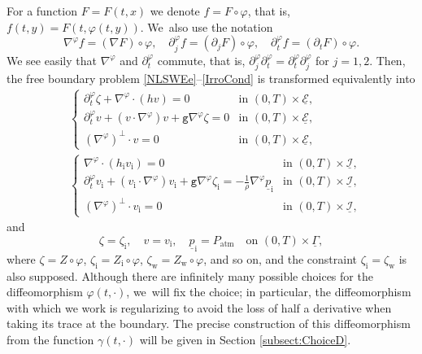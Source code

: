 \documentclass[10pt]{amsart}
\newcommand{\gr}{{\mathtt g}}
\newcommand{\dt}{\partial_t}
\newcommand{\cI}{{\mathcal I}}
\newcommand{\cE}{{\mathcal E}}
\newcommand{\ul}[1]{\underline{#1}}
\newcommand{\itGamma}{\mathit{\Gamma}}
\theoremstyle{definition}
\begin{document}
For a function $F=F(t,x)$ we denote $f=F\circ\varphi$, that is, $f(t,y)=F(t,\varphi(t,y))$. We~also use the notation
\begin{equation}\label{DiffOP}
\nabla^\varphi f=(\nabla F)\circ\varphi, \quad \partial_j^\varphi f=(\partial_j F)\circ\varphi,
\quad \dt^\varphi f=(\dt F)\circ\varphi.
\end{equation}
We see easily that $\nabla^\varphi$ and $\dt^\varphi$ commute, that is, $\partial_j^\varphi \dt^\varphi = \dt^\varphi \partial_j^\varphi$ for $j=1,2$.
Then, the free boundary problem \eqref{NLSWEe}--\eqref{IrroCond} is transformed equivalently into
\begin{align}\label{nlswe}
&\begin{cases}
\dt^\varphi\zeta+\nabla^\varphi\cdot(hv) = 0 &\text{in } (0,T)\times\ul{\cE}, \\
\dt^\varphi v+(v\cdot\nabla^\varphi)v+\gr\nabla^\varphi \zeta = 0 &\text{in } (0,T)\times\ul{\cE}, \\
(\nabla^\varphi)^\perp\cdot v=0 &\text{in } (0,T)\times\ul{\cE},
\end{cases}
\\
\label{nlswi}
&\begin{cases}
\nabla^\varphi\cdot(h_\mathrm{i}v_\mathrm{i}) = 0 &\text{in } (0,T)\times\ul{\cI}, \\
\dt^\varphi v_\mathrm{i}+(v_\mathrm{i}\cdot\nabla^\varphi)v_\mathrm{i}+\gr\nabla^\varphi \zeta_\mathrm{i}
= -\frac{1}{\rho}\nabla^\varphi\ul{p}_\mathrm{i} &\text{in } (0,T)\times\ul{\cI}, \\
(\nabla^\varphi)^\perp\cdot v_\mathrm{i}=0 &\text{in } (0,T)\times\ul{\cI},
\end{cases}
\end{align}
and
\begin{equation}\label{mc}
\zeta=\zeta_\mathrm{i}, \quad v=v_\mathrm{i}, \quad \ul{p}_\mathrm{i}=P_\mathrm{atm} \quad\text{on } (0,T)\times\ul{\itGamma},
\end{equation}
where $\zeta=Z\circ\varphi$, $\zeta_\mathrm{i}=Z_\mathrm{i}\circ\varphi$, $\zeta_\mathrm{w}=Z_\mathrm{w}\circ\varphi$, and so on,
and the constraint $\zeta_\mathrm{i}=\zeta_\mathrm{w}$ is also supposed.
Although there are infinitely many possible choices for the diffeomorphism $\varphi(t,\cdot)$, we~will fix the choice;
in particular, the diffeomorphism with which we work is regularizing to avoid the loss of half a derivative when taking its trace at the boundary.
The precise construction of this diffeomorphism from the function $\gamma(t,\cdot)$ will be given in Section \ref{subsect:ChoiceD}.
\end{document}
